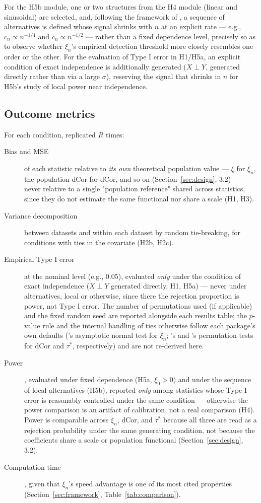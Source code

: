 \documentclass[article]{ajs}
\begin{document}
For the H5b module, one or two structures from the H4 module (linear
and sinusoidal) are selected, and, following the framework of
\citet{auddy2024}, a sequence of alternatives is defined whose signal
shrinks with $n$ at an explicit rate --- e.g., $c_n \propto n^{-1/4}$
and $c_n \propto n^{-1/2}$ --- rather than a fixed dependence level,
precisely so as to observe whether $\xi_n$'s empirical detection
threshold more closely resembles one order or the other. For the
evaluation of Type I error in H1/H5a, an explicit condition of exact
independence is additionally generated ($X \perp Y$, generated
directly rather than via a large $\sigma$), reserving the signal that
shrinks in $n$ for H5b's study of local power near independence.

\subsection{Outcome metrics}

For each condition, replicated $R$ times:

\begin{description}
\item[Bias and MSE] of each statistic relative to \emph{its own}
  theoretical population value --- $\xi$ for $\xi_n$, the population
  dCor for dCor, and so on (Section~\ref{sec:design}, 3.2) --- never
  relative to a single "population reference" shared across
  statistics, since they do not estimate the same functional nor share
  a scale (H1, H3).
\item[Variance decomposition] between datasets and within each dataset
  by random tie-breaking, for conditions with ties in the covariate
  (H2b, H2c).
\item[Empirical Type I error] at the nominal level (e.g., $0.05$),
  evaluated \emph{only} under the condition of exact independence
  ($X \perp Y$ generated directly, H1, H5a) --- never under
  alternatives, local or otherwise, since there the rejection
  proportion is power, not Type I error. The number of permutations
  used (if applicable) and the fixed random seed are reported alongside
  each results table; the $p$-value rule and the internal handling of
  ties otherwise follow each package's own defaults ('s
  asymptotic normal test for $\xi_n$; 's and
  's permutation tests for dCor and $\tau^\ast$,
  respectively) and are not re-derived here.
\item[Power], evaluated under fixed dependence (H5a, $\xi_0>0$) and
  under the sequence of local alternatives (H5b), reported \emph{only}
  among statistics whose Type I error is reasonably controlled under
  the same condition --- otherwise the power comparison is an artifact
  of calibration, not a real comparison (H4). Power is comparable
  across $\xi_n$, dCor, and $\tau^\ast$ because all three are read as a
  rejection probability under the same generating condition, not
  because the coefficients share a scale or population functional
  (Section~\ref{sec:design}, 3.2).
\item[Computation time], given that $\xi_n$'s speed advantage is one of
  its most cited properties (Section~\ref{sec:framework},
  Table~\ref{tab:comparison}).
\end{description}
\end{document}
